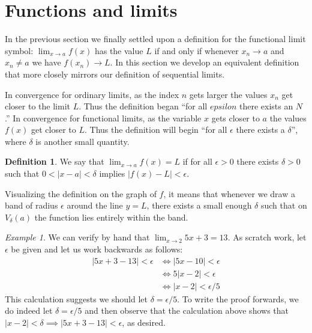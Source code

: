 \documentclass[11pt,oneside]{amsbook}
\theoremstyle{definition}
\theoremstyle{plain}
\theoremstyle{definition}
\newtheorem{defn}[thm]{Definition}
\theoremstyle{remark}
\newtheorem{example}[thm]{Example}
\numberwithin{equation}{section}
\numberwithin{figure}{section}
\begin{document}
\newpage
\section{Functions and limits}

In the previous section we finally settled upon a definition for the functional limit symbol: $\lim_{x\to a}f(x)$ has the value $L$ if and only if whenever $x_n\to a$ and $x_n\neq a$ we have $f(x_n)\to L$. In this section we develop an equivalent definition that more closely mirrors our definition of sequential limits.

In convergence for ordinary limits, as the index $n$ gets larger the values $x_n$ get closer to the limit $L$. Thus the definition began ``for all $epsilon$ there exists an $N$.'' In convergence for functional limits, as the variable $x$ gets closer to $a$ the values $f(x)$ get closer to $L$. Thus the definition will begin ``for all $\epsilon$ there exists a $\delta$'', where $\delta$ is another small quantity.

\begin{defn}
  We say that $\lim_{x\to a}f(x)=L$ if for all $\epsilon>0$ there exists $\delta>0$ such that $0<|x-a|<\delta$ implies $|f(x)-L|<\epsilon$.
\end{defn}

Visualizing the definition on the graph of $f$, it means that whenever we draw a band of radius $\epsilon$ around the line $y=L$, there exists a small enough $\delta$ such that on $V_\delta(a)$ the function lies entirely within the band.
\begin{center}
\end{center}

\begin{example}
  We can verify by hand that $\lim_{x\to2}5x+3=13$. As scratch work, let $\epsilon$ be given and let us work backwards as follows:
  \begin{align*}
    |5x+3-13|<\epsilon&\iff|5x-10|<\epsilon\\
                      &\iff5|x-2|<\epsilon\\
                      &\iff|x-2|<\epsilon/5
  \end{align*}
  This calculation suggests we should let $\delta=\epsilon/5$. To write the proof forwards, we do indeed let $\delta=\epsilon/5$ and then observe that the calculation above shows that $|x-2|<\delta\implies|5x+3-13|<\epsilon$, as desired.
\end{example}
\end{document}
